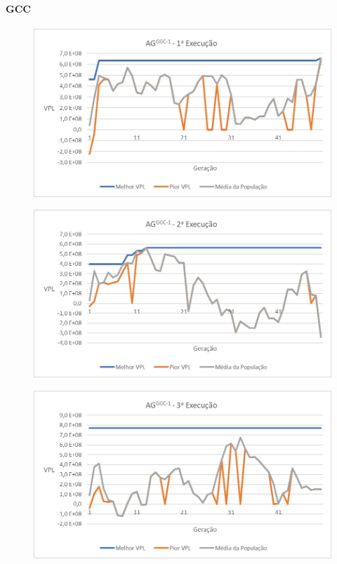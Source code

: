 \documentclass[12pt,a4paper]{report}
\begin{document}
\appendix
\chapter{}
\subsubsection{GCC}

\begin{figure}[H]
\centering

\includegraphics[scale=1]{ApA/GCC/1}
\end{figure}

\begin{figure}[H]
\centering

\includegraphics[scale=1]{ApA/GCC/2}
\end{figure}

\begin{figure}[H]
\centering

\includegraphics[scale=1]{ApA/GCC/3}
\end{figure}
\end{document}
